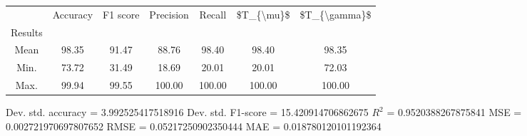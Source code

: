 \begin{tabular}{|c|c|c|c|c|c|c|}
\toprule
{} &  Accuracy &  F1 score &  Precision &  Recall &  \$T\_\{\textbackslash mu\}\$ &  \$T\_\{\textbackslash gamma\}\$ \\
Results &           &           &            &         &            &               \\
\hline
Mean    &     98.35 &     91.47 &      88.76 &   98.40 &      98.40 &         98.35 \\
Min.    &     73.72 &     31.49 &      18.69 &   20.01 &      20.01 &         72.03 \\
Max.    &     99.94 &     99.55 &     100.00 &  100.00 &     100.00 &        100.00 \\
\bottomrule
\end{tabular}

 Dev. std. accuracy = 3.992525417518916
 Dev. std. F1-score = 15.420914706862675
 $R^2$ = 0.9520388267875841
 MSE = 0.002721970697807652
 RMSE = 0.05217250902350444
 MAE = 0.018780120101192364